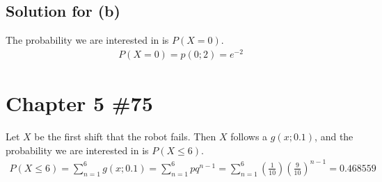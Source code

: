 \documentclass{scrartcl}
\begin{document}
\subsection{Solution for (b)}
The probability we are interested in is \(P(X = 0)\).
\begin{align*}
  P(X = 0)
  = p(0; 2)
  = e^{-2}
\end{align*}

\section{Chapter 5 \#75}
Let \(X\) be the first shift that the robot fails. Then \(X\) follows a \(g(x;
0.1)\), and the probability we are interested in is \(P(X \le 6)\).
\begin{align*}
  P(X \le 6)
  = \sum^6_{n = 1} g(x; 0.1)
  = \sum^6_{n = 1} pq^{n - 1}
  = \sum^6_{n = 1}
    \left( \frac{1}{10} \right) \left( \frac{9}{10} \right)^{n - 1}
  = 0.468559
\end{align*}
\end{document}
